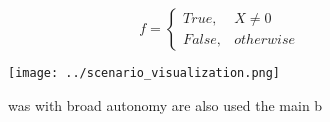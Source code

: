 \documentclass[a4paper]{article}
\begin{document}
\begin{equation}   f =
\begin{cases} True, & X \neq 0\\
False, & otherwise
\end{cases}
\end{equation}

\begin{figure}
\centering
\texttt{[image: ../scenario\_visualization.png]}
\caption{ was with broad autonomy are also used the main b
}
\end{figure}
 
\end{document}

